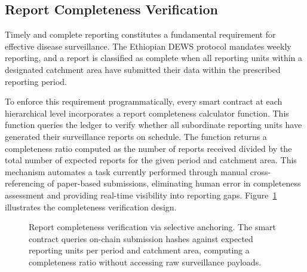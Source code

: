 \documentclass[AMA,LATO1COL]{WileyNJD-v2}
\begin{document}
\subsection{Report Completeness Verification}\label{subsec:completeness}

Timely and complete reporting constitutes a fundamental requirement for effective disease surveillance. The Ethiopian DEWS protocol mandates weekly reporting, and a report is classified as complete when all reporting units within a designated catchment area have submitted their data within the prescribed reporting period.

To enforce this requirement programmatically, every smart contract at each hierarchical level incorporates a report completeness calculator function. This function queries the ledger to verify whether all subordinate reporting units have generated their surveillance reports on schedule. The function returns a completeness ratio computed as the number of reports received divided by the total number of expected reports for the given period and catchment area. This mechanism automates a task currently performed through manual cross-referencing of paper-based submissions, eliminating human error in completeness assessment and providing real-time visibility into reporting gaps. Figure~\ref{fig:completeness} illustrates the completeness verification design.

\begin{figure}[!ht]
\centering
{}
\caption{Report completeness verification via selective anchoring. The smart contract queries on-chain submission hashes against expected reporting units per period and catchment area, computing a completeness ratio without accessing raw surveillance payloads.}\label{fig:completeness}
\end{figure}
%
%
%
\end{document}

